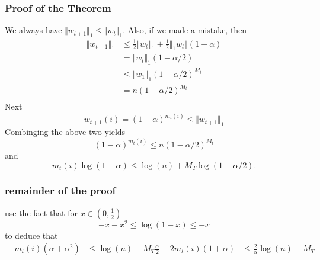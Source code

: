 \documentclass{beamer}
\begin{document}
\begin{frame}
  \frametitle{Proof of the Theorem}
  We always have $ \Vert w_{t+1} \Vert_1 \le \Vert w_t \Vert_1$. Also, if we made a mistake, then
  \begin{equation}
    \begin{aligned}
      \Vert w_{t+1} \Vert_1 &\le \frac12 \Vert w_t \Vert_1 + \frac12 \Vert_1 w_t \Vert (1-\alpha) \\
      &= \Vert w_t \Vert_1 (1-\alpha/2) \\
      &\le \Vert w_1 \Vert_1 (1-\alpha/2)^{M_t} \\
      &= n (1-\alpha/2)^{M_t} \\
    \end{aligned}
  \end{equation}
  Next
  \begin{equation}
    w_{t+1}(i) = (1-\alpha)^{m_t(i)} \le \Vert w_{t+1} \Vert_1
  \end{equation}
  Combinging the above two yields
  \begin{equation}
    {(1-\alpha)}^{m_t(i)} \le n (1-\alpha/2)^{M_t}
  \end{equation}
  and
  \begin{equation}
    m_t(i) \log(1-\alpha) \le \log(n) + M_T \log(1-\alpha/2).
  \end{equation}
\end{frame}

%
\begin{frame}
  \frametitle{remainder of the proof}
  use the fact that for $x\in (0,\frac12)$
  \begin{equation}
    -x -x^2 \le \log(1-x) \le -x
  \end{equation}
  to deduce that
  \begin{equation}
    \begin{aligned}
    - m_t(i) (\alpha+\alpha^2) &\le \log(n) - M_T \frac{\alpha}{2}
    -2 m_t(i) (1+\alpha) &\le \frac{2}{\alpha}\log(n) - M_T
    \end{aligned}
  \end{equation}

\end{frame}
\end{document}
